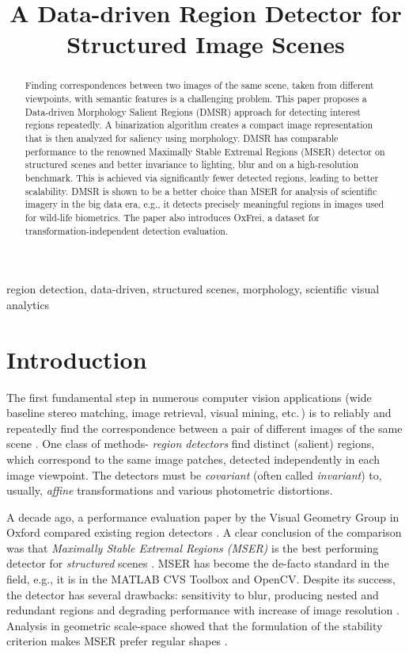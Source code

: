 \documentclass{article}
\title{A Data-driven Region Detector for Structured Image Scenes}
\begin{document}


\maketitle

\begin{abstract}
Finding correspondences between two images of the same scene, taken from different viewpoints, with semantic features is a challenging problem.
This paper proposes a Data-driven Morphology Salient Regions (DMSR) approach for detecting interest regions repeatedly. 
A binarization algorithm creates a compact image representation that is then analyzed for saliency using morphology.
DMSR has comparable performance to the renowned Maximally Stable Extremal Regions (MSER) detector on structured scenes 
and better invariance to lighting, blur and on a high-resolution benchmark. 
This is achieved via significantly fewer detected regions, leading to better scalability. %
DMSR is shown to be a better choice than MSER for analysis of scientific imagery in the big data era, e.g.,
it detects precisely meaningful regions in images used for wild-life biometrics.
The paper also introduces OxFrei, a dataset for transformation-independent detection evaluation.
\end{abstract}

\begin{keywords}
region detection, data-driven, structured scenes, morphology, scientific visual analytics
\end{keywords}

\section{Introduction}
\label{sec:intro}
The first fundamental step in numerous computer vision applications (wide baseline stereo matching, image retrieval, visual mining, etc.\,) is to reliably and repeatedly find  the correspondence between a pair of different images of the same scene \cite{Matas2002BMVC, Rodriguez2013, EscaleraCVPR07}. One class of methods- {\em region detectors} find distinct (salient) regions, which correspond to the same image patches, detected independently in each image viewpoint. The detectors must be {\em covariant} (often called {\em invariant}) to, usually, {\em affine} transformations and various photometric distortions. 


A decade ago, a performance evaluation paper by the Visual Geometry Group in Oxford compared existing region detectors \cite{Mikolajczyk:2005}. 
A clear conclusion of the comparison was that {\em  Maximally Stable Extremal Regions (MSER)} is the best performing detector for {\em structured} scenes \cite{Matas2002BMVC}. MSER has become the de-facto standard in the field, e.g., it is in the MATLAB CVS Toolbox and OpenCV. Despite its success, the detector has several drawbacks: sensitivity to blur, producing nested and redundant regions and degrading performance with increase of image resolution \cite{CorRos2013}. Analysis in geometric scale-space showed that the formulation of the stability criterion makes MSER prefer regular shapes \cite{Kimmel11}.
\end{document}
